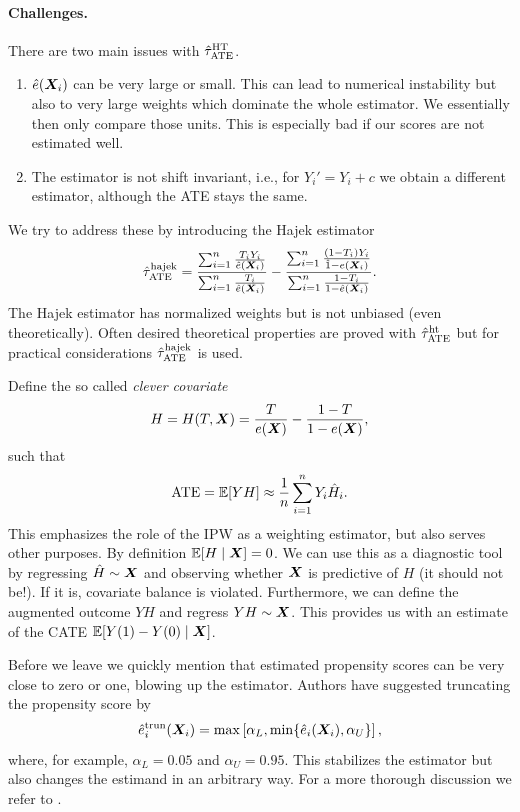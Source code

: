 \documentclass[11pt]{exam}
\begin{document}
\paragraph{Challenges.}
There are two main issues with $\hat \tau_{\mathrm{ATE}}^{\mathrm{HT}}$.
\begin{enumerate}
    \item $\hat e(\bm{X}_i)$ can be very large or small. This can lead to numerical instability but also to very large weights which dominate the whole estimator. We essentially then only compare those units. This is especially bad if our scores are not estimated well.
    \item The estimator is not shift invariant, i.e., for $Y_i' = Y_i + c$ we obtain a different estimator, although the ATE stays the same.
\end{enumerate}

We try to address these by introducing the Hajek estimator \citep{Hajek1971Comment}
\[
    \hat \tau_{\mathrm{ATE}}^{\mathrm{hajek}} = \frac{\sum_{i=1}^n \frac{T_i Y_i}{\hat e(\bm{X}_i)}}{\sum_{i=1}^n \frac{T_i}{\hat e(\bm{X}_i)}} - \frac{\sum_{i=1}^n \frac{(1 - T_i) Y_i}{\hat 1 - e(\bm{X}_i)}}{\sum_{i=1}^n \frac{1 - T_i}{1 - \hat e(\bm{X}_i)}}.
\]
The Hajek estimator has normalized weights but is not unbiased (even theoretically). Often desired theoretical properties are proved with $\hat \tau_{\mathrm{ATE}}^{\mathrm{ht}}$ but for practical considerations $\hat \tau_{\mathrm{ATE}}^{\mathrm{hajek}}$ is used.

\begin{remark}
    Define the so called \emph{clever covariate} 
    \[
    H = H(T, \bm{X}) = \frac{T}{e(\bm{X})} - \frac{1 - T}{1 - e(\bm{X})},
    \]
    such that
    \[
    \mathrm{ATE} = \mathbb{E}[Y H] \approx \frac{1}{n} \sum_{i=1}^n Y_i \hat H_i.
    \]
    This emphasizes the role of the IPW as a weighting estimator, but also serves other purposes. By definition $\mathbb{E}[H \mid \bm{X}] = 0$. We can use this as a diagnostic tool by regressing $\hat H \sim \bm{X}$ and observing whether $\bm{X}$ is predictive of $H$ (it should not be!). If it is, covariate balance is violated. Furthermore, we can define the augmented outcome $YH$ and regress $YH \sim \bm{X}$. This provides us with an estimate of the CATE $\mathbb{E}[Y(1) - Y(0) \mid \bm{X}]$.
\end{remark}

Before we leave we quickly mention that estimated propensity scores can be very close to zero or one, blowing up the estimator. Authors have suggested truncating the propensity score by
\[
    \hat e_i^{\mathrm{trun}}(\bm{X}_i) = \max\left[\alpha_L, \min\{\hat e_i(\bm{X}_i) , \alpha_U\}\right],
\]
where, for example, $\alpha_L = 0.05$ and $\alpha_U = 0.95$. This stabilizes the estimator but also changes the estimand in an arbitrary way. For a more thorough discussion we refer to \citet[Section~11.2.3]{ding2023coursecausalinference}.
\end{document}
